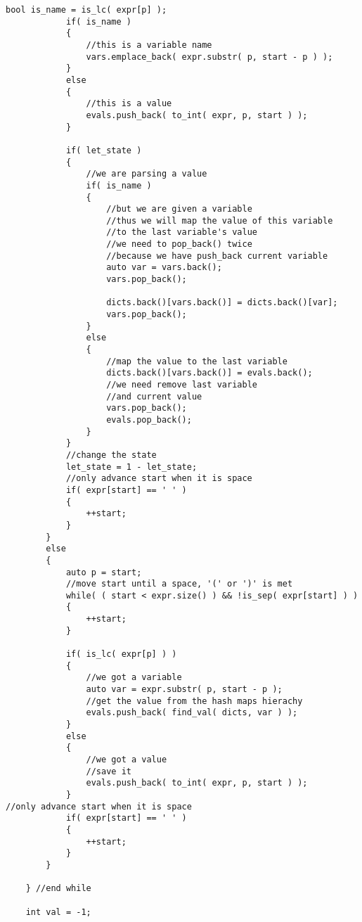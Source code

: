 \begin{lstlisting}[style=customc, caption={Recursive Parsing}]
            bool is_name = is_lc( expr[p] );
            if( is_name )
            {
                //this is a variable name
                vars.emplace_back( expr.substr( p, start - p ) );
            }
            else
            {
                //this is a value
                evals.push_back( to_int( expr, p, start ) );
            }

            if( let_state )
            {
                //we are parsing a value
                if( is_name )
                {
                    //but we are given a variable
                    //thus we will map the value of this variable
                    //to the last variable's value
                    //we need to pop_back() twice
                    //because we have push_back current variable
                    auto var = vars.back();
                    vars.pop_back();

                    dicts.back()[vars.back()] = dicts.back()[var];
                    vars.pop_back();
                }
                else
                {
                    //map the value to the last variable
                    dicts.back()[vars.back()] = evals.back();
                    //we need remove last variable
                    //and current value
                    vars.pop_back();
                    evals.pop_back();
                }
            }
            //change the state
            let_state = 1 - let_state;
            //only advance start when it is space
            if( expr[start] == ' ' )
            {
                ++start;
            }
        }
        else
        {
            auto p = start;
            //move start until a space, '(' or ')' is met
            while( ( start < expr.size() ) && !is_sep( expr[start] ) )
            {
                ++start;
            }

            if( is_lc( expr[p] ) )
            {
                //we got a variable
                auto var = expr.substr( p, start - p );
                //get the value from the hash maps hierachy
                evals.push_back( find_val( dicts, var ) );
            }
            else
            {
                //we got a value
                //save it
                evals.push_back( to_int( expr, p, start ) );
            }
//only advance start when it is space
            if( expr[start] == ' ' )
            {
                ++start;
            }
        }

    } //end while

    int val = -1;


\end{lstlisting}
